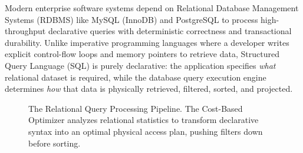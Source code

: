 \documentclass[10pt,journal,compsoc,onecolumn]{IEEEtran}
\begin{document}
Modern enterprise software systems depend on Relational Database Management Systems (RDBMS) like MySQL (InnoDB) and PostgreSQL to process high-throughput declarative queries with deterministic correctness and transactional durability. Unlike imperative programming languages where a developer writes explicit control-flow loops and memory pointers to retrieve data, Structured Query Language (SQL) is purely declarative: the application specifies \textit{what} relational dataset is required, while the database query execution engine determines \textit{how} that data is physically retrieved, filtered, sorted, and projected.

\begin{figure}[htbp]
\centering
{}
\caption{The Relational Query Processing Pipeline. The Cost-Based Optimizer analyzes relational statistics to transform declarative syntax into an optimal physical access plan, pushing filters down before sorting.}
\label{fig:pipeline}
\end{figure}
\end{document}
